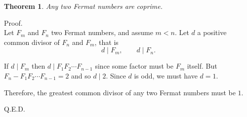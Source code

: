 \documentclass[12pt]{article}
\newtheorem*{thm*}{Theorem}
\begin{document}
\begin{thm*}
Any two Fermat numbers are coprime.
\end{thm*}

Proof.\\
Let $F_m$ and $F_n$ two Fermat numbers, and assume $m<n$.
Let $d$ a positive common divisor of $F_n$ and $F_m$, that is
\[
  d \mid F_m,\qquad d\mid F_n.
\]

If $d\mid F_m$ then $d\mid F_1F_2\cdots F_{n-1}$
since some factor must be $F_m$ itself.
But $F_n-F_1F_2\cdots F_{n-1}=2$ and so $d \mid 2$.
Since $d$ is odd, we must have $d=1$.

Therefore, the greatest common divisor of any two Fermat numbers must be $1$.

Q.E.D.
\end{document}
